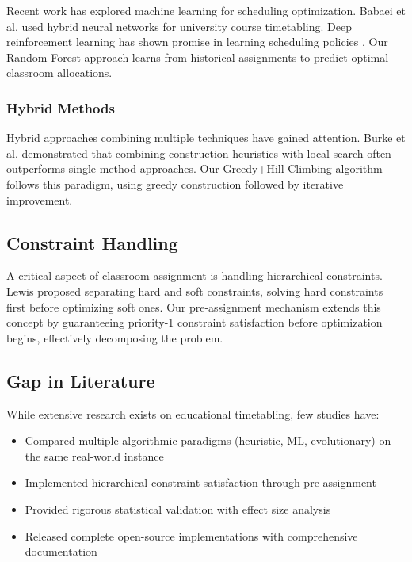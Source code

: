 \documentclass[algorithms,article,submit,pdftex,moreauthors]{Definitions/mdpi}
\begin{document}
Recent work has explored machine learning for scheduling optimization. Babaei et al. \citep{ref-babaei2015} used hybrid neural networks for university course timetabling. Deep reinforcement learning has shown promise in learning scheduling policies \citep{ref-zhang2020}. Our Random Forest approach learns from historical assignments to predict optimal classroom allocations.

\subsubsection{Hybrid Methods}

Hybrid approaches combining multiple techniques have gained attention. Burke et al. \citep{ref-burke2013} demonstrated that combining construction heuristics with local search often outperforms single-method approaches. Our Greedy+Hill Climbing algorithm follows this paradigm, using greedy construction followed by iterative improvement.

\subsection{Constraint Handling}

A critical aspect of classroom assignment is handling hierarchical constraints. Lewis \citep{ref-lewis2007} proposed separating hard and soft constraints, solving hard constraints first before optimizing soft ones. Our pre-assignment mechanism extends this concept by guaranteeing priority-1 constraint satisfaction before optimization begins, effectively decomposing the problem.

\subsection{Gap in Literature}

While extensive research exists on educational timetabling, few studies have:
\begin{itemize}
\item Compared multiple algorithmic paradigms (heuristic, ML, evolutionary) on the same real-world instance
\item Implemented hierarchical constraint satisfaction through pre-assignment
\item Provided rigorous statistical validation with effect size analysis
\item Released complete open-source implementations with comprehensive documentation
\end{itemize}
\end{document}
